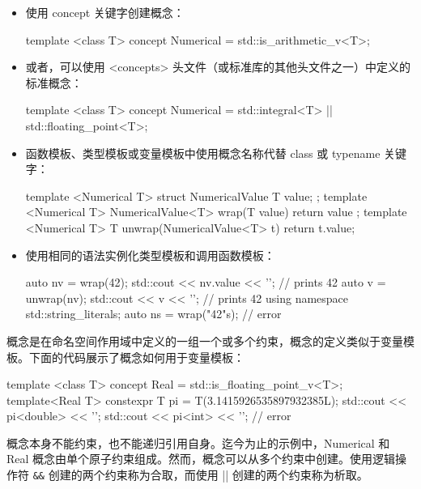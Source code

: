 \begin{itemize}
\item
使用 concept 关键字创建概念：

\begin{cpp}
template <class T>
concept Numerical = std::is_arithmetic_v<T>;
\end{cpp}

\item
或者，可以使用 <concepts> 头文件（或标准库的其他头文件之一）中定义的标准概念：

\begin{cpp}
template <class T>
concept Numerical = std::integral<T> || std::floating_point<T>;
\end{cpp}

\item
函数模板、类型模板或变量模板中使用概念名称代替 class 或 typename 关键字：

\begin{cpp}
template <Numerical T>
struct NumericalValue
{
    T value;
};
template <Numerical T>
NumericalValue<T> wrap(T value) { return { value }; }
template <Numerical T>
T unwrap(NumericalValue<T> t) { return t.value; }
\end{cpp}

\item
使用相同的语法实例化类型模板和调用函数模板：

\begin{cpp}
auto nv = wrap(42);
std::cout << nv.value << '\n';   // prints 42
auto v = unwrap(nv);
std::cout << v << '\n';          // prints 42
using namespace std::string_literals;
auto ns = wrap("42"s);           // error
\end{cpp}
\end{itemize}


概念是在命名空间作用域中定义的一组一个或多个约束，概念的定义类似于变量模板。下面的代码展示了概念如何用于变量模板：

\begin{cpp}
template <class T>
concept Real = std::is_floating_point_v<T>;
template<Real T>
constexpr T pi = T(3.1415926535897932385L);
std::cout << pi<double> << '\n';
std::cout << pi<int>    << '\n'; // error
\end{cpp}

概念本身不能约束，也不能递归引用自身。迄今为止的示例中，Numerical 和 Real 概念由单个原子约束组成。然而，概念可以从多个约束中创建。使用逻辑操作符 \verb|&&| 创建的两个约束称为合取，而使用 || 创建的两个约束称为析取。

